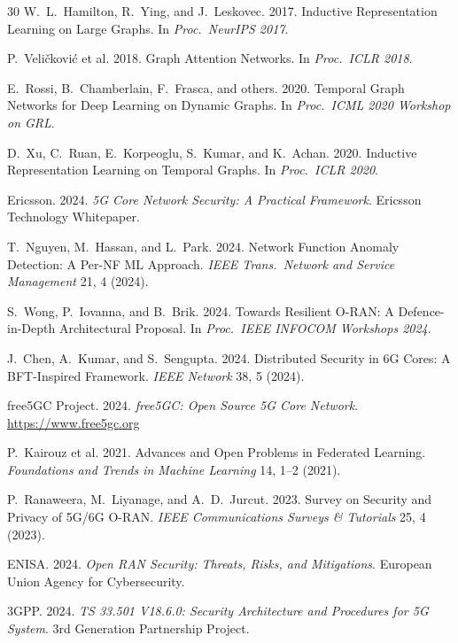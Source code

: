 \documentclass[sigconf,nonacm]{acmart}
\begin{document}
\begin{thebibliography}{30}
W.~L.~Hamilton, R.~Ying, and J.~Leskovec. 2017. Inductive Representation
Learning on Large Graphs. In \textit{Proc.\ NeurIPS 2017}.

P.~Veli\v{c}kovi\'c et al. 2018. Graph Attention Networks. In
\textit{Proc.\ ICLR 2018}.

E.~Rossi, B.~Chamberlain, F.~Frasca, and others. 2020. Temporal
Graph Networks for Deep Learning on Dynamic Graphs.
In \textit{Proc.\ ICML 2020 Workshop on GRL}.

D.~Xu, C.~Ruan, E.~Korpeoglu, S.~Kumar, and K.~Achan. 2020.
Inductive Representation Learning on Temporal Graphs.
In \textit{Proc.\ ICLR 2020}.

Ericsson. 2024. \textit{5G Core Network Security: A Practical
Framework}. Ericsson Technology Whitepaper.

T.~Nguyen, M.~Hassan, and L.~Park. 2024. Network Function Anomaly
Detection: A Per-NF ML Approach.
\textit{IEEE Trans.\ Network and Service Management} 21, 4 (2024).

S.~Wong, P.~Iovanna, and B.~Brik. 2024. Towards Resilient
O-RAN: A Defence-in-Depth Architectural Proposal.
In \textit{Proc.\ IEEE INFOCOM Workshops 2024}.

J.~Chen, A.~Kumar, and S.~Sengupta. 2024. Distributed Security in
6G Cores: A BFT-Inspired Framework. \textit{IEEE Network} 38, 5
(2024).

free5GC Project. 2024. \textit{free5GC: Open Source 5G Core
Network}. \url{https://www.free5gc.org}

P.~Kairouz et al. 2021. Advances and Open Problems in Federated
Learning. \textit{Foundations and Trends in Machine Learning} 14,
1--2 (2021).

P.~Ranaweera, M.~Liyanage, and A.~D.~Jurcut. 2023. Survey on
Security and Privacy of 5G/6G O-RAN. \textit{IEEE Communications
Surveys \& Tutorials} 25, 4 (2023).

ENISA. 2024. \textit{Open RAN Security: Threats, Risks, and
Mitigations}. European Union Agency for Cybersecurity.

3GPP. 2024. \textit{TS 33.501 V18.6.0: Security Architecture and
Procedures for 5G System}. 3rd Generation Partnership Project.


\end{thebibliography}
\end{document}
